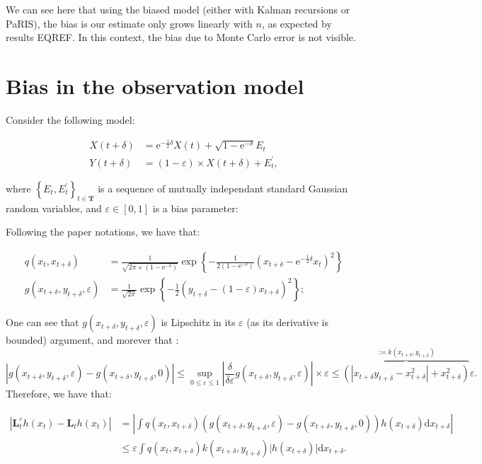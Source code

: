 \documentclass[]{article}
\begin{document}
We can see here that using the biased model (either with Kalman
recursions or PaRIS), the bias is our estimate only grows linearly with
\(n\), as expected by results EQREF. In this context, the bias due to
Monte Carlo error is not visible.

\section{Bias in the observation
model}\label{bias-in-the-observation-model}

Consider the following model:

\begin{align}
X(t + \delta) &= \text{e}^{-\frac{1}{2} \delta} X(t) + \sqrt{1 - \text{e}^{-\delta}} E_t \\
Y(t + \delta) &= ( 1 - \varepsilon) \times X(t + \delta) + E^{'}_t,
\end{align}

where \(\left\lbrace E_t, E^{'}_t \right\rbrace_{t\in \mathbf{T}}\) is a
sequence of mutually independant standard Gaussian random variables, and
\(\varepsilon \in [0,1]\) is a bias parameter:

Following the paper notations, we have that:

\begin{align*}
q(x_t, x_{t + \delta}) &=\frac{1}{\sqrt{2\pi\times (1 - \text{e}^{-\delta})}}\exp\left\lbrace-\frac{1}{2(1 - \text{e}^{-\delta})} \left( x_{t+\delta} - \text{e}^{-\frac{1}{2} \delta} x_t \right)^2 \right\rbrace\\
g(x_{t + \delta}, y_{t + \delta},\varepsilon) &= \frac{1}{\sqrt{2\pi}} \exp\left\lbrace -\frac{1}{2} \left( y_{t+\delta} - (1 - \varepsilon) x_{t + \delta} \right)^2\right\rbrace;
\end{align*}

One can see that \(g(x_{t + \delta}, y_{t + \delta}, \varepsilon)\) is
Lipschitz in its \(\varepsilon\) (as its derivative is bounded)
argument, and morever that :
\[\left\vert g(x_{t + \delta}, y_{t + \delta},\varepsilon) - g(x_{t + \delta}, y_{t + \delta},0)\right\vert \leq \sup_{0\leq \varepsilon \leq 1} \left\vert\frac{\delta}{\delta \varepsilon} g(x_{t + \delta}, y_{t + \delta},\varepsilon)\right\vert \times \varepsilon
\leq \overbrace{\left( \left\vert x_{t + \delta}y_{t + \delta} - x^2_{t + \delta} \right\vert + x^2_{t + \delta}\right)}^{:= k(x_{t + \delta}, y_{t + \delta})} \varepsilon.\]
Therefore, we have that:

\begin{align*}
\left\vert \mathbf{L}_t^\varepsilon h(x_t) - \mathbf{L}_t h(x_t)  \right\vert &= \left\vert \int q(x_t, x_{t + \delta} )\left( g(x_{t + \delta}, y_{t + \delta},\varepsilon) - g(x_{t + \delta}, y_{t + \delta}, 0)\right) h(x_{t+\delta})\text{d}x_{t + \delta}  \right\vert\\
&\leq \varepsilon \int q(x_t, x_{t + \delta} ) k(x_{t + \delta},y_{t + \delta}) \vert h(x_{t+\delta})\vert  \text{d} x_{t + \delta}.
\end{align*}
\end{document}
